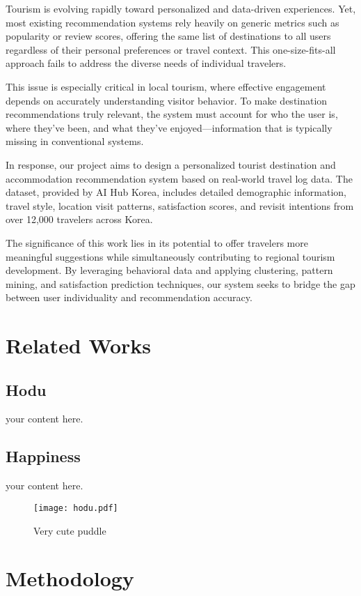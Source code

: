 \documentclass[sigconf]{acmart}
\begin{document}
Tourism is evolving rapidly toward personalized and data-driven experiences. Yet, most existing recommendation systems rely heavily on generic metrics such as popularity or review scores, offering the same list of destinations to all users regardless of their personal preferences or travel context. This one-size-fits-all approach fails to address the diverse needs of individual travelers.

This issue is especially critical in local tourism, where effective engagement depends on accurately understanding visitor behavior. To make destination recommendations truly relevant, the system must account for who the user is, where they’ve been, and what they’ve enjoyed—information that is typically missing in conventional systems.

In response, our project aims to design a personalized tourist destination and accommodation recommendation system based on real-world travel log data. The dataset, provided by AI Hub Korea, includes detailed demographic information, travel style, location visit patterns, satisfaction scores, and revisit intentions from over 12,000 travelers across Korea.

The significance of this work lies in its potential to offer travelers more meaningful suggestions while simultaneously contributing to regional tourism development. By leveraging behavioral data and applying clustering, pattern mining, and satisfaction prediction techniques, our system seeks to bridge the gap between user individuality and recommendation accuracy.



\section{Related Works}
\subsection{Hodu}
your content here.
\subsection{Happiness}
your content here.
 \begin{figure}[h]
  \centering
  \texttt{[image: hodu.pdf]}
  \caption{Very cute puddle}
  \label{fig:baby puddle}
 \end{figure}

\section{Methodology}
\end{document}

